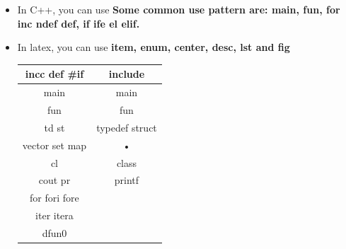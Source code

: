 \documentclass[a4paper,11pt,twoside]{book}
\begin{document}
\begin{itemize}
		\item In C++, you can use \textbf{Some common use pattern are: 	main, fun, for inc ndef def, if ife el elif.} 
		\item In latex, you can use \textbf{item, enum, center, desc, lst and fig}

\begin{tabular}{|c|c|}
\hline 
incc def \#if & include \\ 
\hline 
main & main \\ 
\hline 
fun & fun \\ 
\hline 
td st & typedef struct \\ 
\hline 
vector set map & • \\ 
\hline 
cl & class \\ 
\hline 
cout pr & printf \\ 
\hline 
for fori fore &  \\ 
\hline 
iter itera &  \\ 
\hline 
dfun0  &  \\ 

\hline 
\end{tabular} 
\end{itemize}
\end{document}
